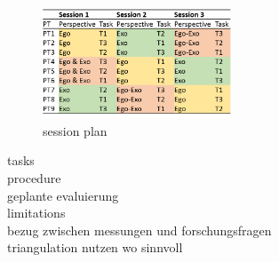 \begin{figure}[htb]
	\centering
	\includegraphics[width=0.5\textwidth]{figures/study_session_plan.png}
	\caption[session plan]{session plan}
	\label{fig:study_session_plan}
\end{figure}

tasks\\
procedure\\
geplante evaluierung\\
limitations\\
bezug zwischen messungen und forschungsfragen\\
triangulation nutzen wo sinnvoll\\

